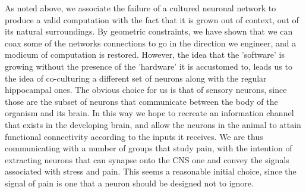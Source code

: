 As noted above, we associate the failure of a cultured neuronal network to produce a valid computation with the fact that it is grown out of context, out of its natural surroundings. By geometric constraints, we have shown that we can coax some of the networks connections to go in the direction we engineer, and a modicum of computation is restored. However, the idea that the 'software' is growing without the presence of the 'hardware' it is accustomed to, leads us to the idea of co-culturing a different set of neurons along with the regular hippocampal ones. The obvious choice for us is that of sensory neurons, since those are the subset of neurons that communicate between the body of the organism and its brain. In this way we hope to recreate an information channel that exists in the developing brain, and allow the neurons in the animal to attain functional connectivity according to the inputs it receives. 
We are thus communicating with a number of groups that study pain, with the intention of extracting neurons that can synapse onto the CNS one and convey the signals associated with stress and pain. This seems a reasonable initial choice, since the signal of pain is one that a neuron should be designed not to ignore. 